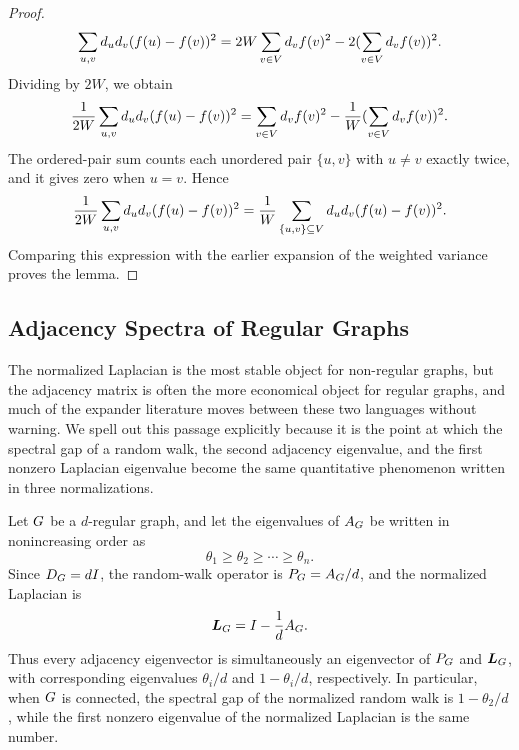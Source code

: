 \begin{proof}
	\begin{equation}
		\sum_{u,v}d_ud_v(f(u)-f(v))^2
		=
		2W\sum_{v\in V}d_v f(v)^2-2(\sum_{v\in V}d_v f(v))^2.
	\end{equation}
	Dividing by \(2W\), we obtain
	\begin{equation}
		\frac{1}{2W}\sum_{u,v}d_ud_v(f(u)-f(v))^2
		=
		\sum_{v\in V}d_v f(v)^2-\frac{1}{W}(\sum_{v\in V}d_v f(v))^2.
	\end{equation}
	The ordered-pair sum counts each unordered pair \(\{u,v\}\) with \(u\neq v\) exactly twice, and it gives zero when \(u=v\). Hence
	\begin{equation}
		\frac{1}{2W}\sum_{u,v}d_ud_v(f(u)-f(v))^2
		=
		\frac{1}{W}\sum_{\{u,v\}\subseteq V}d_ud_v(f(u)-f(v))^2.
	\end{equation}
	Comparing this expression with the earlier expansion of the weighted variance proves the lemma.
\end{proof}

\subsection{Adjacency Spectra of Regular Graphs}
\label{subsec:adjacency-spectra-regular-graphs}

The normalized Laplacian is the most stable object for non-regular graphs, but the adjacency matrix is often the more economical object for regular graphs, and much of the expander literature moves between these two languages without warning. We spell out this passage explicitly because it is the point at which the spectral gap of a random walk, the second adjacency eigenvalue, and the first nonzero Laplacian eigenvalue become the same quantitative phenomenon written in three normalizations.

Let \(G\) be a \(d\)-regular graph, and let the eigenvalues of \(A_{G}\) be written in nonincreasing order as
\begin{equation}
	\theta_1\geq\theta_2\geq\cdots\geq\theta_n.
\end{equation}
Since \(D_{G}=dI\), the random-walk operator is \(P_{G}=A_{G}/d\), and the normalized Laplacian is
\begin{equation}
	\boldsymbol{L}_{G}=I-\frac{1}{d}A_{G}.
\end{equation}
Thus every adjacency eigenvector is simultaneously an eigenvector of \(P_{G}\) and \(\boldsymbol{L}_{G}\), with corresponding eigenvalues \(\theta_i/d\) and \(1-\theta_i/d\), respectively. In particular, when \(G\) is connected, the spectral gap of the normalized random walk is \(1-\theta_2/d\), while the first nonzero eigenvalue of the normalized Laplacian is the same number.

